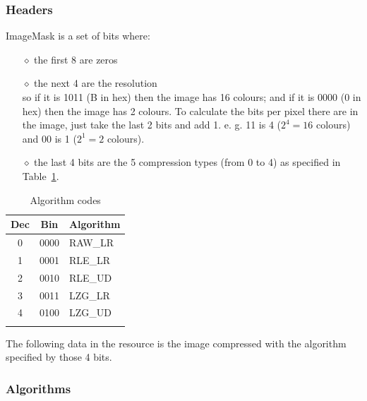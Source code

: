 \documentclass{article}
\begin{document}
\subsubsection{Headers} %



 ImageMask is a set of bits where:
\begin{itemize}
\item[$\diamond$] the first 8 are zeros
\item[$\diamond$] the next 4 are the resolution\\
   so if it is 1011 (B in hex) then the image has 16 colours;
   and if it is 0000 (0 in hex) then the image has 2 colours.
   To calculate the bits per pixel there are in the image, just take the
   last 2 bits and add 1. e. g. 11 is 4 ($2^4=16$ colours) and 00 is 1 ($2^1=2$ colours).
\item[$\diamond$] the last 4 bits are the 5 compression types (from 0 to 4) as specified in Table~\ref{algorithm codes}.
\end{itemize}

\renewcommand{\tabcolsep}{1em}
\begin{longtable}{ccl}
 \hline
  Dec & Bin & Algorithm \\
 \hline
  0 & 0000 & RAW\_LR \\
  1 & 0001 & RLE\_LR \\
  2 & 0010 & RLE\_UD \\
  3 & 0011 & LZG\_LR \\
  4 & 0100 & LZG\_UD \\
 \hline
 \caption{Algorithm codes}
 \label{algorithm codes}
\end{longtable}

 The following data in the resource is the image compressed with the
 algorithm specified by those 4 bits.

\subsubsection{Algorithms} %
\end{document}

